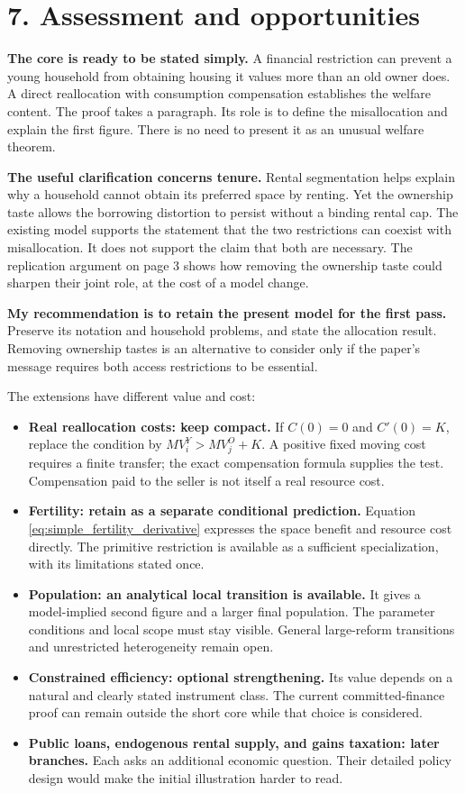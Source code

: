 \documentclass[11pt]{article}
\newcommand{\pageheading}[1]{\section*{#1}}
\begin{document}
\newpage
\pageheading{7. Assessment and opportunities}

\textbf{The core is ready to be stated simply.} A financial restriction can
prevent a young household from obtaining housing it values more than an old
owner does. A direct reallocation with consumption compensation establishes
the welfare content. The proof takes a paragraph. Its role is to define the
misallocation and explain the first figure. There is no need to present it as
an unusual welfare theorem.

\textbf{The useful clarification concerns tenure.} Rental segmentation helps
explain why a household cannot obtain its preferred space by renting. Yet the
ownership taste allows the borrowing distortion to persist without a binding
rental cap. The existing model supports the statement that the two restrictions
can coexist with misallocation. It does not support the claim that both are
necessary. The replication argument on page 3 shows how removing the ownership
taste could sharpen their joint role, at the cost of a model change.

\textbf{My recommendation is to retain the present model for the first pass.}
Preserve its notation and household problems, and state the allocation result.
Removing ownership tastes is an alternative to consider only if the paper's
message requires both access restrictions to be essential.

The extensions have different value and cost:
\begin{itemize}
\item \textbf{Real reallocation costs: keep compact.} If
  $C(0)=0$ and $C'(0)=K$, replace the condition by
  $MV_i^Y>MV_j^O+K$. A positive fixed moving cost requires a finite transfer;
  the exact compensation formula supplies the test. Compensation paid to the
  seller is not itself a real resource cost.
\item \textbf{Fertility: retain as a separate conditional prediction.}
  Equation \eqref{eq:simple_fertility_derivative} expresses the space benefit
  and resource cost directly. The primitive restriction is available as a
  sufficient specialization, with its limitations stated once.
\item \textbf{Population: an analytical local transition is available.}
  It gives a model-implied second figure and a larger final population.
  The parameter conditions and local scope must stay visible. General
  large-reform transitions and unrestricted heterogeneity remain open.
\item \textbf{Constrained efficiency: optional strengthening.} Its value
  depends on a natural and clearly stated instrument class. The current
  committed-finance proof can remain outside the short core while that choice
  is considered.
\item \textbf{Public loans, endogenous rental supply, and gains taxation:
  later branches.} Each asks an additional economic question. Their detailed
  policy design would make the initial illustration harder to read.
\end{itemize}
\end{document}
